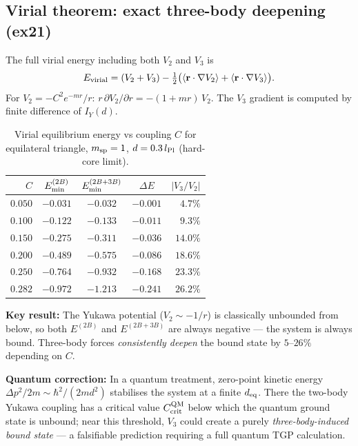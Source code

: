 \subsection{Virial theorem: exact three-body deepening (ex21)}

The full virial energy including both $V_2$ and $V_3$ is
\begin{equation}
  E_{\rm virial} = (V_2+V_3) - \tfrac{1}{2}
  \bigl(\langle\mathbf{r}\cdot\nabla V_2\rangle
       +\langle\mathbf{r}\cdot\nabla V_3\rangle\bigr).
\end{equation}
For $V_2 = -C^2 e^{-mr}/r$: $r\,\partial V_2/\partial r = -(1+mr)\,V_2$.
The $V_3$ gradient is computed by finite difference of $I_Y(d)$.

\begin{table}[h]
\centering
\caption{Virial equilibrium energy vs coupling $C$ for equilateral
triangle, $m_{\rm sp}=1$, $d=0.3\,l_{\rm Pl}$ (hard-core limit).}
\label{tab:virial_C}
\begin{tabular}{rcccr}
\hline
$C$ & $E_{\rm min}^{(2B)}$ & $E_{\rm min}^{(2B+3B)}$ & $\Delta E$ & $|V_3/V_2|$ \\
\hline
$0.050$ & $-0.031$ & $-0.032$ & $-0.001$ & $4.7\%$ \\
$0.100$ & $-0.122$ & $-0.133$ & $-0.011$ & $9.3\%$ \\
$0.150$ & $-0.275$ & $-0.311$ & $-0.036$ & $14.0\%$ \\
$0.200$ & $-0.489$ & $-0.575$ & $-0.086$ & $18.6\%$ \\
$0.250$ & $-0.764$ & $-0.932$ & $-0.168$ & $23.3\%$ \\
$0.282$ & $-0.972$ & $-1.213$ & $-0.241$ & $26.2\%$ \\
\hline
\end{tabular}
\end{table}

\noindent
\textbf{Key result:} The Yukawa potential ($V_2 \sim -1/r$) is classically
unbounded from below, so both $E^{(2B)}$ and $E^{(2B+3B)}$ are always
negative — the system is always bound.  Three-body forces
\emph{consistently deepen} the bound state by $5$--$26\%$
depending on $C$.

\medskip
\noindent
\textbf{Quantum correction:} In a quantum treatment, zero-point kinetic
energy $\Delta p^2/2m \sim \hbar^2/(2m d^2)$ stabilises the system at a
finite $d_{\rm eq}$.  There the two-body Yukawa coupling has a critical
value $C_{\rm crit}^{\rm QM}$ below which the quantum ground state is
unbound; near this threshold, $V_3$ could create a purely
\emph{three-body-induced bound state} — a falsifiable prediction
requiring a full quantum TGP calculation.

